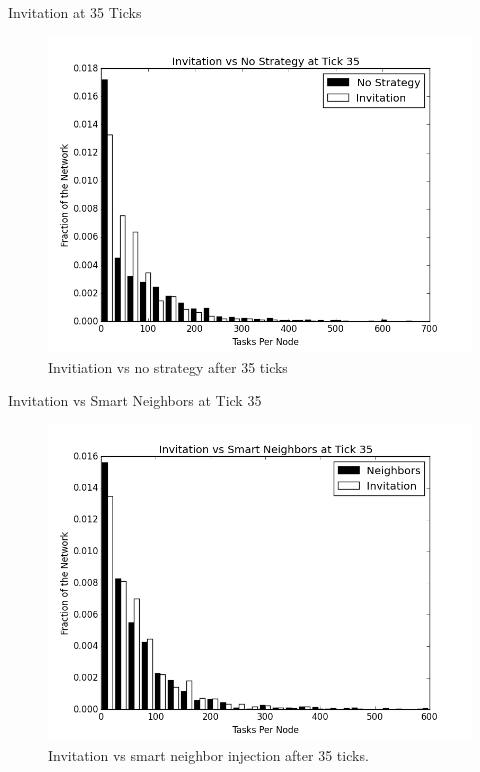 \documentclass[11pt]{beamer}
\begin{document}
\begin{frame}{Invitation at 35 Ticks}
\begin{figure}
	\centering
	\includegraphics[width=0.7\linewidth]{figs/inviteStableHist35}
	\caption[Invitiation vs no strategy after 35 ticks]{Invitiation vs no strategy after 35 ticks}
	\label{fig:inviteStableHist35}
\end{figure}
\end{frame}



\begin{frame}{Invitation vs Smart Neighbors at Tick 35}

\begin{figure}
	\centering
	\includegraphics[width=0.7\linewidth]{figs/inviteNeighborsHist35}
	\caption[Invitation vs smart neighbor injection after 35 ticks.]{Invitation vs smart neighbor injection after 35 ticks.}
	\label{fig:inviteNeighborsHist35}
\end{figure}

\end{frame}
\end{document}
